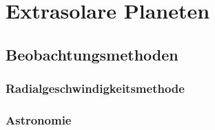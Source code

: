 \chapter{Extrasolare Planeten}
\section{Beobachtungsmethoden}
\subsection{Radialgeschwindigkeitsmethode}
\subsection{Astronomie}
